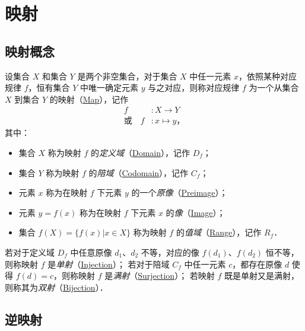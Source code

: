 \newpage
\section{映射}

\subsection{映射概念}

设集合 $X$ 和集合 $Y$ 是两个非空集合，对于集合 $X$ 中任一元素 $x$，依照某种对应规律 $f$，恒有集合 $Y$ 中唯一确定元素 $y$ 与之对应，则称对应规律 $f$ 为一个从集合 $X$ 到集合 $Y$ 的映射（\href{http://mathworld.wolfram.com/Map.html}{Map}），记作
\[
\begin{aligned}
                f&: X \to Y \\
\text{或} \quad f&: x \mapsto y \text{，}
\end{aligned}
\]
其中：
\begin{itemize}
	\item 集合 $X$ 称为映射 $f$ 的\emph{定义域}（\href{http://mathworld.wolfram.com/Domain.html}{Domain}），记作 $D_f$；
	\item 集合 $Y$ 称为映射 $f$ 的\emph{陪域}（\href{http://mathworld.wolfram.com/Codomain.html}{Codomain}），记作 $C_f$；
	\item 元素 $x$ 称为在映射 $f$ 下元素 $y$ 的一个\emph{原像}（\href{http://mathworld.wolfram.com/Preimage.html}{Preimage}）；
	\item 元素 $y=f(x)$ 称为在映射 $f$ 下元素 $x$ 的\emph{像}（\href{http://mathworld.wolfram.com/Image.html}{Image}）；
	\item 集合 $f(X)=\{f(x)|x\in{}X\}$ 称为映射 $f$ 的\emph{值域}（\href{http://mathworld.wolfram.com/Range.html}{Range}），记作 $R_f$．
\end{itemize}

若对于定义域 $D_f$ 中任意原像 $d_1$、$d_2$ 不等，对应的像 $f(d_1)$、$f(d_2)$ 恒不等，则称映射 $f$ 是\emph{单射}（\href{http://mathworld.wolfram.com/Injection.html}{Injection}）；
若对于陪域 $C_f$ 中任一元素 $c$，都存在原像 $d$ 使得 $f(d)=c$，则称映射 $f$ 是\emph{满射}（\href{http://mathworld.wolfram.com/Surjection.html}{Surjection}）；
若映射 $f$ 既是单射又是满射，则称其为\emph{双射}（\href{http://mathworld.wolfram.com/Bijection.html}{Bijection}）．

\subsection{逆映射}

